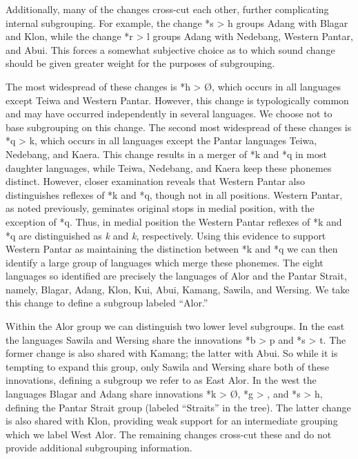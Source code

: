 Additionally, many of the changes cross-cut each other, further complicating internal subgrouping. For example, the change *s {\textgreater} h groups Adang with Blagar and Klon, while the change *r {\textgreater} l groups Adang with Nedebang, Western Pantar, and Abui. This forces a somewhat subjective choice as to which sound change should be given greater weight for the purposes of subgrouping.

The most widespread of these changes is *h {\textgreater} {\O}, which occurs in all languages except Teiwa and Western Pantar. However, this change is typologically common and may have occurred independently in several languages. We choose not to base subgrouping on this change. The second most widespread of these changes is *q {\textgreater} k, which occurs in all languages except the Pantar languages Teiwa, Nedebang, and Kaera. This change results in a merger of *k and *q in most daughter languages, while Teiwa, Nedebang, and Kaera keep these phonemes distinct. However, closer examination reveals that Western Pantar also distinguishes reflexes of *k and *q, though not in all positions. Western Pantar, as noted previously, geminates original stops in medial position, with the exception of *q. Thus, in medial position the Western Pantar reflexes of *k and *q are distinguished as \textit{k{\textlengthmark}} and \textit{k}, respectively. Using this evidence to support Western Pantar as maintaining the 
distinction between *k and *q we can then identify a large group of languages which merge these phonemes. The eight languages so identified are precisely the languages of Alor and the Pantar Strait, namely, Blagar, Adang, Klon, Kui, Abui, Kamang, Sawila, and Wersing. We take this change to define a subgroup labeled ``Alor.''

Within the Alor group we can distinguish two lower level subgroups. In the east the languages Sawila and Wersing share the innovations *b {\textgreater} p and *s {\textgreater} t. The former change is also shared with Kamang; the latter with Abui. So while it is tempting to expand this group, only Sawila and Wersing share both of these innovations, defining a subgroup we refer to as East Alor. In the west the languages Blagar and Adang share innovations *k {\textgreater} {\O}, *g {\textgreater} {\textglotstop}, and *s {\textgreater} h, defining the Pantar Strait group (labeled ``Straits'' in the tree). The latter change is also shared with Klon, providing weak support for an intermediate grouping which we label West Alor. The remaining changes cross-cut these and do not provide additional subgrouping information. 

